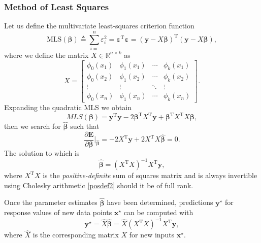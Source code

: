\documentclass[10pt,a4paper]{article}
\numberwithin{equation}{section}
\theoremstyle{plain}
\theoremstyle{own}
\begin{document}
\subsubsection{Method of Least Squares}
Let us define the multivariate least-squares criterion function
\begin{equation}
\mathrm{MLS}(\boldsymbol\beta) \triangleq \sum_{i=}^n \varepsilon_i^2 = \boldsymbol\varepsilon^{\text{T}}\boldsymbol\varepsilon = (\mathbf{y} - X\boldsymbol\beta)^{\text{T}}(\mathbf{y} - X\boldsymbol\beta),
\end{equation}
where we define the matrix $X \in \mathbb{R}^{n \times k}$ as
\begin{equation}
X = \left[ \begin{matrix}
\phi_0(x_1) & \phi_1(x_1) & \cdots & \phi_k(x_1) \\
\phi_0(x_2) & \phi_1(x_2) & \cdots & \phi_k(x_2) \\
\vdots      & \vdots      & \ddots & \vdots      \\
\phi_0(x_n) & \phi_1(x_n) & \cdots & \phi_k(x_n)
\end{matrix} \right].
\end{equation}
Expanding the quadratic MLS we obtain
\begin{equation}
MLS(\boldsymbol\beta) = \mathbf{y}^{\text{T}}\mathbf{y} - 2\boldsymbol\beta^{\text{T}}X^{\text{T}}\mathbf{y} + \boldsymbol\beta^{\text{T}}X^{\text{T}} X\boldsymbol\beta,
\end{equation}
then we search for $\hat{\boldsymbol\beta}$ such that
\begin{equation}
\frac{\partial \mathbf{E}}{\partial \boldsymbol\beta} \Big|_{\hat{\boldsymbol\beta}} = -2X^{\text{T}}\mathbf{y} + 2 X^{\text{T}} X \hat{\boldsymbol\beta} =  0.
\end{equation}
The solution to which is
\begin{equation}
\hat{\boldsymbol\beta} = (X^{\text{T}} X)^{-1} X^{\text{T}}\mathbf{y},
\end{equation}
where $X^{\text{T}}X$ is the \textit{positive-definite} sum of squares matrix and is always invertible using Cholesky arithmetic \ref{posdef2} should it be of full rank.

Once the parameter estimates $\hat{\boldsymbol\beta}$ have been determined, predictions $\mathbf{y}^\star$ for response values of new data points $\mathbf{x}^{\star}$ can be computed with
\begin{equation}
\mathbf{y}^\star = \hat{X} \hat{\boldsymbol\beta} = \hat{X}(X^{\text{T}} X)^{-1} X^{\text{T}}\mathbf{y},
\end{equation}
where $\hat{X}$ is the corresponding matrix $X$ for new inputs $\mathbf{x}^\star$.
\end{document}
